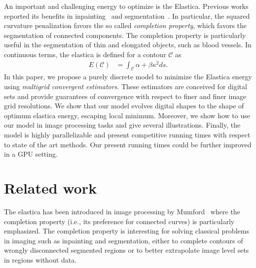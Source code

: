\documentclass{siamart220329}
\newcommand{\C}{\mathcal{C}} %
\begin{document}
An important and challenging energy to optimize is the Elastica. Previous works
reported its benefits in
inpainting~\cite{masnou98inpainting,ballester01filljoint,chan02elasticainpainting}
and
segmentation~\cite{goldluecke11totalcurvature,zhu2013image,nieuwenhuis14efficient,
antunes20}. In particular, the squared curvature penalization favors the so
called \emph{completion property}, which favors the segmentation of connected
components. The completion property is particularly useful in the segmentation
of thin and elongated objects, such as blood vessels. In continuous terms, the
elastica is defined for a contour $\C$ as
%
\begin{align*}
	E(\C) &= \int_{\C}{\alpha + \beta \kappa^2 ds}.
\end{align*}
%
In this paper, we propose a purely discrete model to minimize the Elastica
energy using \emph{multigrid convergent estimators}. These estimators are
conceived for digital sets and provide guarantees of convergence with respect
to finer and finer image grid resolutions. We show that our model evolves
digital shapes to the shape of optimum elastica energy, escaping local minimum.
Moreover, we show how to use our model in image processing tasks and give
several illustrations. Finally, the model is highly parallelizable and present
competitive running times with respect to state of the art methods. Our present
running times could be further improved in a GPU setting.
%
%
\section{Related work}

The elastica has been introduced in image processing by
Mumford~\cite{mumford1994elastica} where the completion property (i.e., its
preference for connected curves) is particularly emphasized. The completion
property is interesting for solving classical problems in imaging such as
inpainting and segmentation, either to complete contours of wrongly disconnected
segmented regions or to better extrapolate image level sets in regions without
data. 
\end{document}
